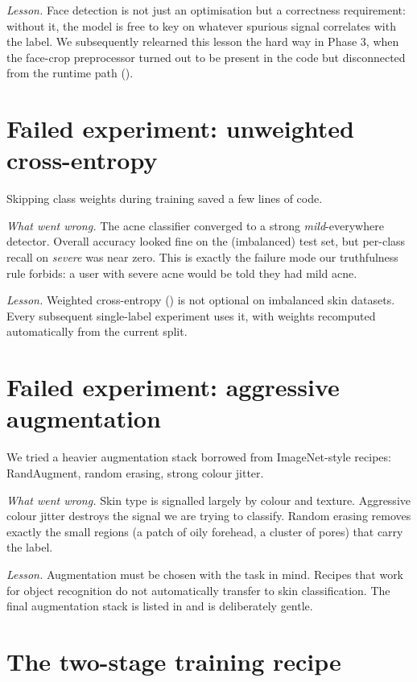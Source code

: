 \documentclass[11pt,a4paper,oneside]{report}
\begin{document}
\emph{Lesson.} Face detection is not just an optimisation but a
correctness requirement: without it, the model is free to key on
whatever spurious signal correlates with the label. We
subsequently relearned this lesson the hard way in Phase 3, when
the face-crop preprocessor turned out to be present in the code
but disconnected from the runtime path ().

\section{Failed experiment: unweighted cross-entropy}

Skipping class weights during training saved a few lines of code.

\emph{What went wrong.} The acne classifier converged to a strong
\emph{mild}-everywhere detector. Overall accuracy looked fine on
the (imbalanced) test set, but per-class recall on \emph{severe}
was near zero. This is exactly the failure mode our truthfulness
rule forbids: a user with severe acne would be told they had mild
acne.

\emph{Lesson.} Weighted cross-entropy () is not
optional on imbalanced skin datasets. Every subsequent single-label
experiment uses it, with weights recomputed automatically from the
current split.

\section{Failed experiment: aggressive augmentation}

We tried a heavier augmentation stack borrowed from ImageNet-style
recipes: RandAugment, random erasing, strong colour jitter.

\emph{What went wrong.} Skin type is signalled largely by colour
and texture. Aggressive colour jitter destroys the signal we are
trying to classify. Random erasing removes exactly the small
regions (a patch of oily forehead, a cluster of pores) that carry
the label.

\emph{Lesson.} Augmentation must be chosen with the task in mind.
Recipes that work for object recognition do not automatically
transfer to skin classification. The final augmentation stack is
listed in  and is deliberately gentle.

\section{The two-stage training recipe}
\end{document}
